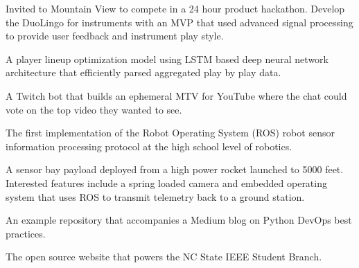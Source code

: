 {%
	Invited to Mountain View to compete in a 24 hour product hackathon. Develop the DuoLingo for instruments with an MVP that used advanced signal processing to provide user feedback and instrument play style.
}

\vspace{0.5em}

{%
	A player lineup optimization model using LSTM based deep neural network architecture that efficiently parsed aggregated play by play data.
}

\vspace{0.5em}

{%
	A Twitch bot that builds an ephemeral MTV for YouTube where the chat could vote on the top video they wanted to see.
}

\vspace{0.5em}

{%
	The first implementation of the Robot Operating System (ROS) robot sensor information processing protocol at the high school level of robotics.
}

\vspace{0.5em}

{%
	A sensor bay payload deployed from a high power rocket launched to 5000 feet. Interested features include a spring loaded camera and embedded operating system that uses ROS to transmit telemetry back to a ground station.
}

\vspace{0.5em}

{%
	An example repository that accompanies a Medium blog on Python DevOps best practices.
}

\vspace{0.5em}

{%
	The open source website that powers the NC State IEEE Student Branch.
}
